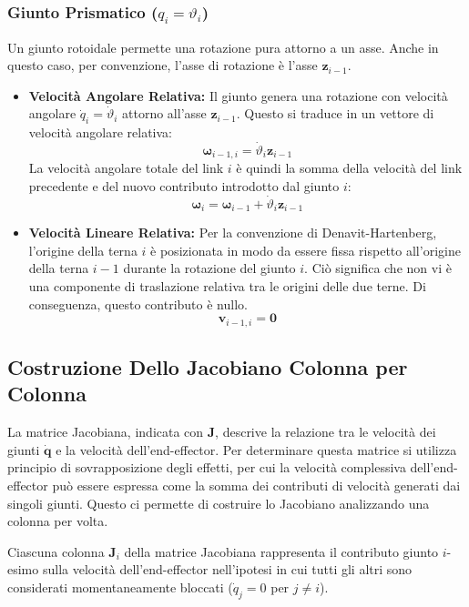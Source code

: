 ﻿\documentclass[11pt, a4paper]{article}
\begin{document}
\subsubsection{Giunto Prismatico (\texorpdfstring{$q_i = \vartheta_i$}{qi = thetai})}
Un giunto rotoidale permette una rotazione pura attorno a un asse. Anche in questo caso, per convenzione, l'asse di rotazione è l'asse \(\bm{z}_{i-1}\).

\begin{itemize}
    \item \textbf{Velocità Angolare Relativa:} Il giunto genera una rotazione con velocità angolare \(\dot{q}_i = \dot{\vartheta}_i\) attorno all'asse \(\bm{z}_{i-1}\). Questo si traduce in un vettore di velocità angolare relativa:
    \[
        \bm{\omega}_{i-1,i} = \dot{\vartheta}_i \bm{z}_{i-1}
    \]
    La velocità angolare totale del link \(i\) è quindi la somma della velocità del link precedente e del nuovo contributo introdotto dal giunto \(i\):
    \[
        \bm{\omega}_i = \bm{\omega}_{i-1} + \dot{\vartheta}_i \bm{z}_{i-1}
    \]

    \item \textbf{Velocità Lineare Relativa:} Per la convenzione di Denavit-Hartenberg, l'origine della terna \(i\) è posizionata in modo da essere fissa rispetto all'origine della terna \(i-1\) durante la rotazione del giunto \(i\). Ciò significa che non vi è una componente di traslazione relativa tra le origini delle due terne. Di conseguenza, questo contributo è nullo.
    \[
        \bm{v}_{i-1,i} = \bm{0}
    \]
\end{itemize}
\newpage
\subsection{Costruzione Dello Jacobiano Colonna per Colonna}
La matrice Jacobiana, indicata con \(\bm{J}\), descrive la relazione tra le velocità dei giunti \(\dot{\bm{q}}\) e la velocità dell'end-effector. Per determinare questa matrice si utilizza principio di sovrapposizione degli effetti, per cui la velocità complessiva dell'end-effector può essere espressa come la somma dei contributi di velocità generati dai singoli giunti. Questo ci permette di costruire lo Jacobiano analizzando una colonna per volta.

Ciascuna colonna \(\bm{J}_i\) della matrice Jacobiana rappresenta il contributo giunto \(i\)-esimo sulla velocità dell'end-effector nell'ipotesi in cui tutti gli altri sono considerati momentaneamente bloccati (\(\dot{q}_j = 0\) per \(j \neq i\)).
\end{document}
